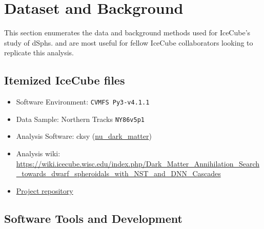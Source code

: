 \section{Dataset and Background}\label{sec:icDM_databgd}

This section enumerates the data and background methods used for IceCube's study of dSphs.
 and  are most useful for fellow IceCube collaborators looking to replicate this analysis.

\subsection{Itemized IceCube files}\label{sec:icDM_data}
\begin{itemize}
    \item Software Environment: \texttt{CVMFS Py3-v4.1.1}
    \item Data Sample: Northern Tracks \texttt{NY86v5p1}
    \item Analysis Software: cksy (\href{https://github.com/icecube/csky/tree/nu\_dark\_matter}{nu\_dark\_matter})
    \item Analysis wiki: \url{https://wiki.icecube.wisc.edu/index.php/Dark\_Matter\_Annihilation\_Search\_towards\_dwarf\_spheroidals\_with\_NST\_and\_DNN\_Cascades}
    \item \href{https://github.com/salaza82/IceCube_dark_matter_dsph}{Project repository}
\end{itemize}

\subsection{Software Tools and Development}\label{sec:icDM_tools}

